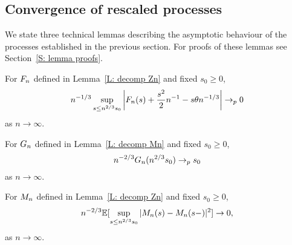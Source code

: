\subsection{Convergence of rescaled processes}
We state three technical lemmas describing the asymptotic behaviour of the processes established in the previous section.
For proofs of these lemmas see Section~\ref{S: lemma proofs}.

\begin{lemma} \label{L: limit An}
	For $F_n$ defined in Lemma~\ref{L: decomp Zn} and fixed $s_0 \geq 0$,
	\begin{equation} \label{E: limit An}
	n^{-1 / 3} \sup_{s \leq n^{2 / 3} s_0 } \left| F_n(s) + \frac{s^2}{2}n^{-1} - s\theta n^{-1 / 3} \right| \rightarrow_p 0
	\end{equation}
	as $n \rightarrow \infty$.
\end{lemma}

\begin{lemma} \label{L: limit Bn}
	For $G_n$ defined in Lemma~\ref{L: decomp Mn} and fixed $s_0 \geq 0$,
	\begin{equation} \label{E: limit Bn}
	n^{-2 / 3} G_n(n^{2 / 3}s_0) \rightarrow_p s_0
	\end{equation}
	as $n \rightarrow \infty$.
\end{lemma}

\begin{lemma} \label{L: limit Mn}
	For $M_n$ defined in Lemma~\ref{L: decomp Zn} and fixed $s_0 \geq 0$,
	\begin{equation} \label{E: limit Mn}
	n^{-2 / 3} \mathbb{E}[\sup_{s \leq n^{2 / 3} s_0 } |M_n(s) - M_n(s-)|^2] \rightarrow 0,
	\end{equation}
	as $n\rightarrow \infty$.
\end{lemma}

